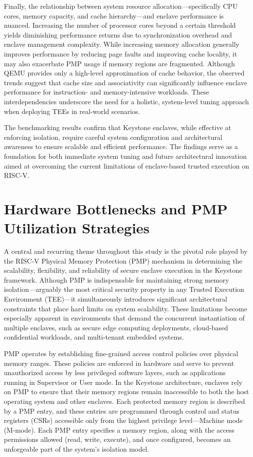 Finally, the relationship between system resource allocation—specifically CPU cores, memory capacity, and cache hierarchy—and enclave performance is nuanced. Increasing the number of processor cores beyond a certain threshold yields diminishing performance returns due to synchronization overhead and enclave management complexity. While increasing memory allocation generally improves performance by reducing page faults and improving cache locality, it may also exacerbate PMP usage if memory regions are fragmented. Although QEMU provides only a high-level approximation of cache behavior, the observed trends suggest that cache size and associativity can significantly influence enclave performance for instruction- and memory-intensive workloads. These interdependencies underscore the need for a holistic, system-level tuning approach when deploying TEEs in real-world scenarios.

The benchmarking results confirm that Keystone enclaves, while effective at enforcing isolation, require careful system configuration and architectural awareness to ensure scalable and efficient performance. The findings serve as a foundation for both immediate system tuning and future architectural innovation aimed at overcoming the current limitations of enclave-based trusted execution on RISC-V.

\section{Hardware Bottlenecks and PMP Utilization Strategies}
A central and recurring theme throughout this study is the pivotal role played by the RISC-V Physical Memory Protection (PMP) mechanism in determining the scalability, flexibility, and reliability of secure enclave execution in the Keystone framework. Although PMP is indispensable for maintaining strong memory isolation—arguably the most critical security property in any Trusted Execution Environment (TEE)—it simultaneously introduces significant architectural constraints that place hard limits on system scalability. These limitations become especially apparent in environments that demand the concurrent instantiation of multiple enclaves, such as secure edge computing deployments, cloud-based confidential workloads, and multi-tenant embedded systems.

PMP operates by establishing fine-grained access control policies over physical memory ranges. These policies are enforced in hardware and serve to prevent unauthorized access by less privileged software layers, such as applications running in Supervisor or User mode. In the Keystone architecture, enclaves rely on PMP to ensure that their memory regions remain inaccessible to both the host operating system and other enclaves. Each protected memory region is described by a PMP entry, and these entries are programmed through control and status registers (CSRs) accessible only from the highest privilege level—Machine mode (M-mode). Each PMP entry specifies a memory region, along with the access permissions allowed (read, write, execute), and once configured, becomes an unforgeable part of the system’s isolation model.

